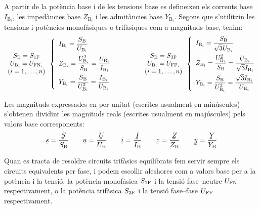 A partir de la potència base i de les tensions base es
defineixen els corrents base $I_{\text{B}_i}$, les impedàncies base $Z_{\text{B}_i}$ i les
admitàncies base $Y_{\text{B}_i}$. Segons que s'utilitzin les tensions i potències monofàsiques o trifàsiques com a magnituds base, tenim:
\begin{equation}
\begin{array}{c}  S_\mathrm{B}=S_\mathrm{1F} \\ U_{\text{B}_i} = U_{\text{FN}_i} \\ (i=1,\ldots,n) \end{array}
\left\{
\begin{array}{l}
   I_{\text{B}_i} = \dfrac{S_\mathrm{B}}{U_{\text{B}_i}} \\[2.5ex]
   Z_{\text{B}_i} = \dfrac{U_{\text{B}_i}^2}{S_\mathrm{B}} = \dfrac{U_{\text{B}_i}}{I_{\text{B}_i}} \\[2.5ex]
   Y_{\text{B}_i} = \dfrac{S_\mathrm{B}}{U_{\text{B}_i}^2} = \dfrac{I_{\text{B}_i}}{U_{\text{B}_i}}
\end{array}
\right.
\qquad\qquad
\begin{array}{c} S_\mathrm{B}=S_\mathrm{3F} \\ U_{\text{B}_i} = U_{\text{FF}_i} \\ (i=1,\ldots,n) \end{array}
\left\{
\begin{array}{l}
   I_{\text{B}_i} = \dfrac{S_\mathrm{B}}{\sqrt{3} U_{\text{B}_i}} \\[2.5ex]
   Z_{\text{B}_i} = \dfrac{U_{\text{B}_i}^2}{S_\mathrm{B}}= \dfrac{U_{\text{B}_i}}{\sqrt{3} I_{\text{B}_i}} \\[2.5ex]
   Y_{\text{B}_i} = \dfrac{S_\mathrm{B}}{U_{\text{B}_i}^2} = \dfrac{\sqrt{3} I_{\text{B}_i}}{U_{\text{B}_i}}
\end{array}
\right.
\label{eq:bases_pu}
\end{equation}

Les magnituds expressades en per unitat (escrites usualment en minúscules) s'obtenen
dividint les magnituds reals (escrites usualment en majúscules) pels valors base corresponents:
\begin{equation}
   \cmplx{s} = \frac{\cmplx{S}}{S\ped{B}} \qquad \cmplx{u} = \frac{\cmplx{U}}{U\ped{B}} \qquad \cmplx{i} = \frac{\cmplx{I}}{I\ped{B}} \qquad \cmplx{z} = \frac{\cmplx{Z}}{Z\ped{B}} \qquad \cmplx{y} = \frac{\cmplx{Y}}{Y\ped{B}}
\end{equation}

Quan es tracta de resoldre circuits trifàsics equilibrats fem servir sempre els circuits equivalents per fase, i podem escollir aleshores com a valors base per a la potència i la tensió, la potència monofàsica $S_\mathrm{1F}$ i la tensió fase--neutre $U_\mathrm{FN}$ respectivament, o la potència trifàsica $S_\mathrm{3F}$ i la tensió fase--fase $U_\mathrm{FF}$ respectivament.


